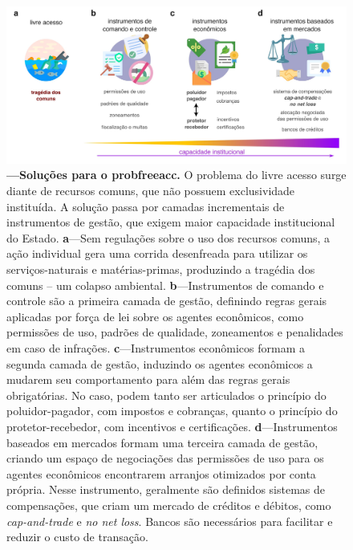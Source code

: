 \documentclass[./main.tex]{subfiles}
\begin{document}
\begin{figure}[t!] 
\centering				
\includegraphics[width=0.98\linewidth]{figs/fig_opensacc.jpg}		
\caption[Soluções para o problema do livre acesso]
{\textbf{---\;Soluções para o \gls{probfreeacc}.}
    O problema do livre acesso surge diante de recursos comuns, que não possuem exclusividade instituída. A solução passa por camadas incrementais de instrumentos de gestão, que exigem maior capacidade institucional do Estado.
    \;\textbf{a}\;---\;Sem regulações sobre o uso dos recursos comuns, a ação individual gera uma corrida desenfreada para utilizar os serviços-naturais e matérias-primas, produzindo a tragédia dos comuns -- um colapso ambiental.
    \;\textbf{b}\;---\;Instrumentos de comando e controle são a primeira camada de gestão, definindo regras gerais aplicadas por força de lei sobre os agentes econômicos, como permissões de uso, padrões de qualidade, zoneamentos e penalidades em caso de infrações. 
    \;\textbf{c}\;---\;Instrumentos econômicos formam a segunda camada de gestão, induzindo os agentes econômicos a mudarem seu comportamento para além das regras gerais obrigatórias. No caso, podem tanto ser articulados o princípio do poluidor-pagador, com impostos e cobranças, quanto o princípio do protetor-recebedor, com incentivos e certificações. 
    \;\textbf{d}\;---\;Instrumentos baseados em mercados formam uma terceira camada de gestão, criando um espaço de negociações das permissões de uso para os agentes econômicos encontrarem arranjos otimizados por conta própria. Nesse instrumento, geralmente são definidos sistemas de compensações, que criam um mercado de créditos e débitos, como \textit{cap-and-trade} e \textit{no net loss}. Bancos são necessários para facilitar e reduzir o custo de transação. 
}
\label{fig:eco:tragedy} 		
\end{figure}
\end{document}
